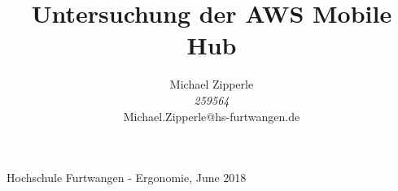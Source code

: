\documentclass[journal]{IEEEtran}
\begin{document}
\title{Untersuchung der AWS Mobile Hub}

\author{\begin{center}
 Michael Zipperle \\ 
 \textit{259564} \\
 Michael.Zipperle@hs-furtwangen.de \\
\end{center}}%
        
%
{Hochschule Furtwangen - Ergonomie, June 2018}

\maketitle


\begin{abstract}

\end{abstract}


\IEEEpeerreviewmaketitle










%
%
\end{document}
